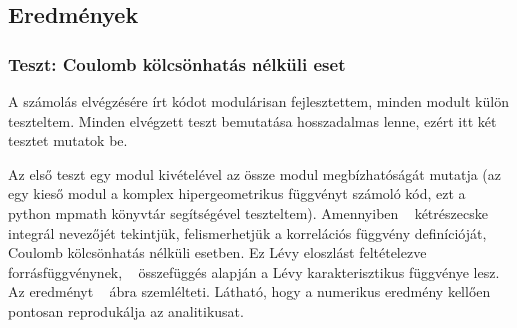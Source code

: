\documentclass[11pt,a4paper]{article}
\numberwithin{equation}{subsection}
\numberwithin{figure}{section}
\begin{document}
\subsection{Eredmények}

\subsubsection{Teszt: Coulomb kölcsönhatás nélküli eset}

A számolás elvégzésére írt kódot modulárisan fejlesztettem, minden modult külön teszteltem. Minden elvégzett teszt bemutatása hosszadalmas lenne, ezért itt két tesztet mutatok be. 

Az első teszt egy modul kivételével az össze modul megbízhatóságát mutatja (az egy kieső modul a komplex hipergeometrikus függvényt számoló kód, ezt a python mpmath könyvtár segítségével teszteltem). Amennyiben ~ kétrészecske integrál nevezőjét tekintjük, felismerhetjük a korrelációs függvény definícióját, Coulomb kölcsönhatás nélküli esetben. Ez Lévy eloszlást feltételezve forrásfüggvénynek, ~ összefüggés alapján a Lévy karakterisztikus függvénye lesz. Az eredményt ~ ábra szemlélteti. Látható, hogy a numerikus eredmény kellően pontosan reprodukálja az analitikusat.
\end{document}
